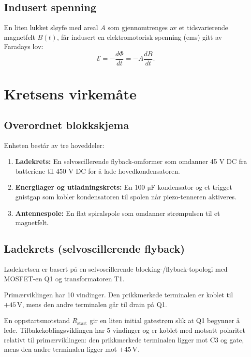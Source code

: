 \documentclass{article}
\begin{document}
\subsection{Indusert spenning}
En liten lukket sløyfe med areal $A$ som gjennomtrenges av et tidsvarierende magnetfelt $B(t)$, får indusert en elektromotorisk spenning (ems) gitt av Faradays lov:
\begin{equation}
\mathcal{E} = -\frac{d\Phi}{dt} = -A \frac{dB}{dt}.
\end{equation}

\section{Kretsens virkemåte}

\subsection{Overordnet blokkskjema}
Enheten består av tre hoveddeler:
\begin{enumerate}
\item \textbf{Ladekrets:} En selvoscillerende flyback-omformer som omdanner 45 V DC fra batteriene til 450 V DC for å lade hovedkondensatoren.
\item \textbf{Energilager og utladningskrets:} En 100 µF kondensator og et trigget gnistgap som kobler kondensatoren til spolen når piezo-tenneren aktiveres.
\item \textbf{Antennespole:} En flat spiralspole som omdanner strømpulsen til et magnetfelt.
\end{enumerate}

\subsection{Ladekrets (selvoscillerende flyback)}

Ladekretsen er basert på en selvoscillerende blocking-/flyback-topologi med
MOSFET-en Q1 og transformatoren T1.

Primærviklingen har 10 vindinger. Den prikkmerkede terminalen er koblet til
$+45\,\text{V}$, mens den andre terminalen går til drain på Q1.

En oppstartsmotstand $R_{\text{start}}$ gir en liten initial gatestrøm slik at
Q1 begynner å lede. Tilbakekoblingsviklingen har 5 vindinger og er koblet med
motsatt polaritet relativt til primærviklingen: den prikkmerkede terminalen
ligger mot C3 og gate, mens den andre terminalen ligger mot $+45\,\text{V}$.
\end{document}
